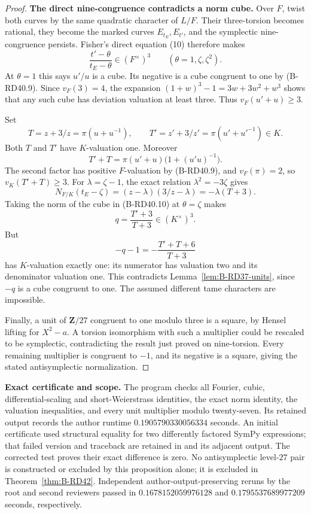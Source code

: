 \begin{proof}
\par\smallskip\noindent\textbf{The direct nine-congruence contradicts a norm cube.}
Over $F$, twist both curves by the same quadratic character of $L/F$.
Their three-torsion becomes rational, they become the marked curves
$E_{t_E},E_{t'}$, and the symplectic nine-congruence persists.
Fisher's direct equation (10) therefore makes
\[
       \frac{t'-\theta}{t_E-\theta}\in(F^\times)^3
          \qquad(\theta=1,\zeta,\zeta^2).
                                                        \tag{B-RD40.10}
\]
At $\theta=1$ this says $u'/u$ is a cube. Its negative is a cube
congruent to one by (B-RD40.9). Since $v_F(3)=4$, the expansion
$(1+w)^3-1=3w+3w^2+w^3$ shows that any such cube has deviation
valuation at least three. Thus $v_F(u'+u)\ge3$.

Set
\[
 T=z+3/z=\pi(u+u^{-1}),\qquad
 T'=z'+3/z'=\pi(u'+u'^{-1})\in K.
\]
Both $T$ and $T'$ have $K$-valuation one. Moreover
\[
       T'+T=\pi(u'+u)\bigl(1+(u'u)^{-1}\bigr).
\]
The second factor has positive $F$-valuation by (B-RD40.9), and
$v_F(\pi)=2$, so $v_K(T'+T)\ge3$.
For $\lambda=\zeta-1$, the exact relation
$\lambda^2=-3\zeta$ gives
\[
 N_{F/K}(t_E-\zeta)
       =(z-\lambda)(3/z-\lambda)=-\lambda(T+3).
\]
Taking the norm of the cube in (B-RD40.10) at $\theta=\zeta$
makes
\[
                 q=\frac{T'+3}{T+3}\in(K^\times)^3.
\]
But
\[
              -q-1=-\frac{T'+T+6}{T+3}
\]
has $K$-valuation exactly one: its numerator has valuation two
and its denominator valuation one. This contradicts
Lemma~\ref{lem:B-RD37-units}, since $-q$ is a cube congruent to one.
The assumed different tame characters are impossible.

Finally, a unit of $\mathbf Z/27$ congruent to one modulo three is
a square, by Hensel lifting for $X^2-a$. A torsion isomorphism with
such a multiplier could be rescaled to be symplectic, contradicting
the result just proved on nine-torsion. Every remaining multiplier
is congruent to $-1$, and its negative is a square, giving the stated
antisymplectic normalization.
\end{proof}

\par\smallskip\noindent\textbf{Exact certificate and scope.}
The program  checks all
Fourier, cubic, differential-scaling and short-Weierstrass identities,
the exact norm identity, the valuation inequalities, and every
unit multiplier modulo twenty-seven. Its retained output records
the author runtime $0.1905790330056334$ seconds. An initial
certificate used structural equality for two differently factored
SymPy expressions; that failed version and traceback are retained in
 and
its adjacent output. The corrected test proves their exact difference
is zero. No antisymplectic level-$27$ pair is constructed or
excluded by this proposition alone; it is excluded in
Theorem~\ref{thm:B-RD42}. Independent author-output-preserving reruns by the
root and second reviewers passed in $0.1678152059976128$ and
$0.1795537689977209$ seconds, respectively.


